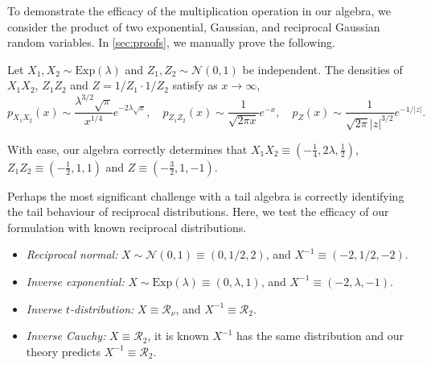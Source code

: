 \documentclass[thesis.tex]{subfiles}
\begin{document}
\begin{example}
	To demonstrate the efficacy of the multiplication operation in our algebra, we consider the product of two exponential, Gaussian, and reciprocal Gaussian random variables. In \cref{sec:proofs}, we manually prove the following.
	\begin{lemma}
	\label{lem:Products}
		Let $X_1,X_2 \sim \mbox{Exp}(\lambda)$ and $Z_1,Z_2 \sim \mathcal{N}(0,1)$ be independent. The densities of $X_1 X_2$, $Z_1 Z_2$ and $Z = 1/Z_1 \cdot 1/Z_2$ satisfy as $x \to \infty$,
		\[
			p_{X_1 X_2}(x) \sim \frac{\lambda^{3/2}\sqrt{\pi}}{x^{1/4}} e^{-2\lambda \sqrt{x}},\quad p_{Z_1 Z_2}(x) \sim \frac{1}{\sqrt{2\pi x}} e^{-x},\quad
			p_{Z}(x) \sim \frac{1}{\sqrt{2\pi}|z|^{3/2}}e^{-1/|z|}.
		\]
	\end{lemma}
	With ease, our algebra correctly determines that $X_1 X_2 \equiv (-\frac14,2\lambda,\frac12)$, $Z_1 Z_2 \equiv (-\frac12, 1, 1)$ and $Z \equiv (-\frac32,1,-1)$.
\end{example}


\begin{example}
	Perhaps the most significant challenge with a tail algebra is correctly identifying the tail behaviour of reciprocal distributions. Here, we test the efficacy of our formulation with known reciprocal distributions.
	\begin{itemize}
		\item \emph{Reciprocal normal:} $X \sim \mathcal{N}(0,1) \equiv (0,1/2,2)$, and $X^{-1} \equiv (-2,1/2,-2)$.
		\item \emph{Inverse exponential:} $X \sim \text{Exp}(\lambda) \equiv (0,\lambda,1)$, and $X^{-1} \equiv (-2,\lambda,-1)$.
		\item \emph{Inverse $t$-distribution:} $X \equiv \mathcal{R}_\nu$, and $X^{-1} \equiv \mathcal{R}_2$.
		\item \emph{Inverse Cauchy:} $X \equiv \mathcal{R}_2$, it is known $X^{-1}$
		      has the same distribution and our theory predicts $X^{-1} \equiv \mathcal{R}_2$.
	\end{itemize}
\end{example}
\end{document}
